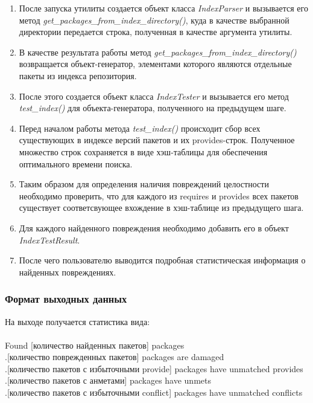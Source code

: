 \begin{enumerate}
\item
После запуска утилиты создается объект класса \textit{IndexParser} и вызывается его метод
\textit{get\_packages\_from\_index\_directory()}, куда в качестве выбранной
директории передается строка, полученная в качестве аргумента утилиты.

\item
В качестве результата работы метод \textit{get\_packages\_from\_index\_directory()}
возвращается объект-генератор, элементами которого являются отдельные пакеты из индекса 
репозитория.

\item
После этого создается объект класса \textit{IndexTester} и вызывается его метод
\textit{test\_index()} для объекта-генератора, полученного на предыдущем шаге.

\item
Перед началом работы метода \textit{test\_index()} происходит сбор всех существующих
в индексе версий пакетов и их provides-строк. Полученное множество строк сохраняется
в виде хэш-таблицы для обеспечения оптимального времени поиска.

\item
Таким образом для определения наличия повреждений целостности
необходимо проверить, что для каждого из requires и provides всех пакетов
существует соответсвующее вхождение в хэш-таблице из предыдущего шага.

\item 
Для каждого найденного повреждения необходимо добавить его в объект \textit{IndexTestResult}.

\item
После чего пользователю выводится подробная статистическая информация о найденных повреждениях.

\end{enumerate}

\subsubsection{Формат выходных данных}

На выходе получается статистика вида:\\
\\
Found [количество найденных пакетов] packages\\
.[количество поврежденных пакетов] packages are damaged\\
.[количество пакетов с избыточными provide] packages have unmatched provides\\
.[количество пакетов с анметами] packages have unmets\\
.[количество пакетов с избыточными conflict] packages have unmatched conflicts\\

